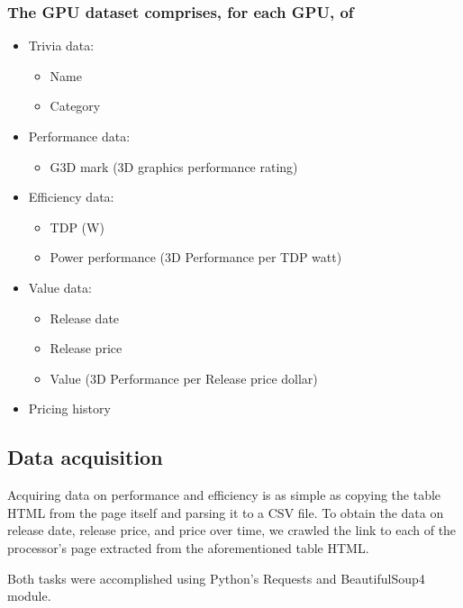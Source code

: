 \documentclass[conference]{IEEEtran}
\begin{document}
\subsubsection{The GPU dataset comprises, for each GPU, of}
\begin{itemize}
	\item Trivia data:
	      \begin{itemize}
		      \item Name
		      \item Category
	      \end{itemize}
	\item Performance data:
	      \begin{itemize}
		      \item G3D mark (3D graphics performance rating)
	      \end{itemize}
	\item Efficiency data:
	      \begin{itemize}
		      \item TDP (W)
		      \item Power performance (3D Performance per TDP watt)
	      \end{itemize}
	\item Value data:
	      \begin{itemize}
		      \item Release date
		      \item Release price
		      \item Value (3D Performance per Release price dollar)
	      \end{itemize}
	\item Pricing history
\end{itemize}

\subsection{Data acquisition}
Acquiring data on performance and efficiency is as simple as copying the
table HTML from the page itself and parsing it to a CSV file.
To obtain the data on release date, release price, and price over time,
we crawled the link to each of the processor's page extracted from the
aforementioned table HTML.

Both tasks were accomplished using Python's Requests and BeautifulSoup4 module.
\end{document}
